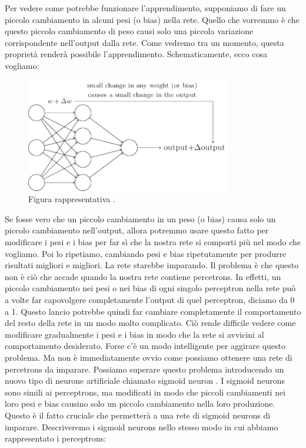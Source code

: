 
Per vedere come potrebbe funzionare l'apprendimento, supponiamo di fare un piccolo cambiamento in alcuni pesi (o bias) nella rete. Quello che vorremmo è che questo piccolo cambiamento di peso causi solo una piccola variazione corrispondente nell'output dalla rete. Come vedremo tra un momento, questa proprietà renderà possibile l'apprendimento. Schematicamente, ecco cosa vogliamo:

\begin{figure}
\includegraphics[width=%
0.8\textwidth]{figures/fig08}
\caption[Idea di un s.]{Figura rappresentativa .
\label{fig:myInlineFigure}}
\end{figure}

Se fosse vero che un piccolo cambiamento in un peso (o bias) causa solo un piccolo cambiamento nell'output, allora potremmo usare questo fatto per modificare i pesi e i bias per far sì che la nostra rete si comporti più nel modo che vogliamo. Poi lo ripetiamo, cambiando pesi e bias ripetutamente per produrre risultati migliori e migliori. La rete starebbe imparando.
Il problema è che questo non è ciò che accade quando la nostra rete contiene percetrons. In effetti, un piccolo cambiamento nei pesi o nei bias di ogni singolo perceptron nella rete può a volte far capovolgere completamente l'output di quel perceptron, diciamo da 0 a 1. Questo lancio potrebbe quindi far cambiare completamente il comportamento del resto della rete in un modo molto complicato. 
Ciò rende difficile vedere come modificare gradualmente i pesi e i bias in modo che la rete si avvicini al comportamento desiderato. Forse c'è un modo intelligente per aggirare questo problema. Ma non è immediatamente ovvio come possiamo ottenere una rete di percetrons da imparare.
Possiamo superare questo problema introducendo un nuovo tipo di neurone artificiale chiamato sigmoid neuron . I sigmoid neurons sono simili ai perceptrons, ma modificati in modo che piccoli cambiamenti nei loro pesi e bias causino solo un piccolo cambiamento nella loro produzione. Questo è il fatto cruciale che permetterà a una rete di sigmoid neurons di imparare. 
Descriveremo i sigmoid neurons nello stesso modo in cui abbiamo rappresentato i perceptrons:

